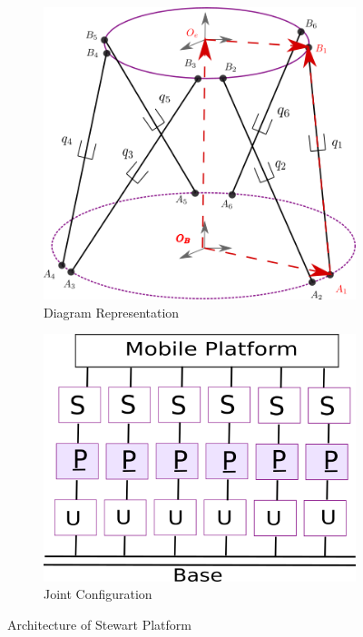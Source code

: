 \documentclass[12pt, twoside]{report}
\begin{document}
\begin{figure}[H]
     \centering
     \begin{subfigure}[b]{0.5\textwidth}
         \centering
         \includegraphics[width=\textwidth]{TP_2/diagram1_stewart.png}
         \caption{Diagram Representation}
         \label{fig:st1}
     \end{subfigure}
     \hfill
     \begin{subfigure}[b]{0.5\textwidth}
         \centering
         \includegraphics[width=\textwidth]{TP_2/stewartjoints.png}
         \caption{Joint Configuration}
         \label{fig:st2}
     \end{subfigure}
        \caption{Architecture of Stewart Platform}
        \label{fig:stt}
\end{figure}
\end{document}
